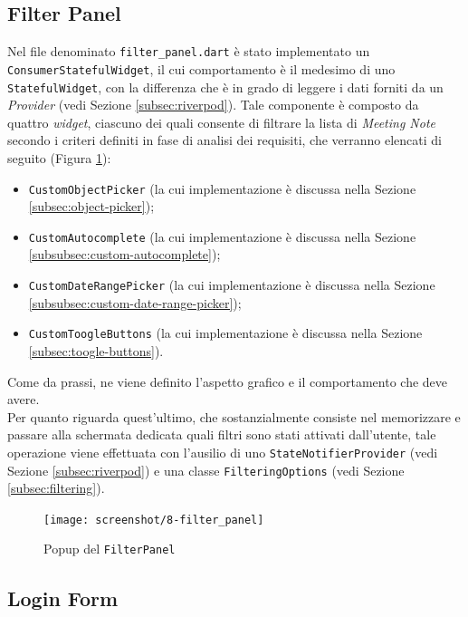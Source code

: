 \subsection{Filter Panel}
\label{subsec:filter-panel}

Nel file denominato \lstinline{filter_panel.dart} è stato implementato un \lstinline{ConsumerStatefulWidget}\cite{site:reading-provider}, il cui comportamento è il medesimo di uno \lstinline{StatefulWidget}, con la differenza che è in grado di leggere i dati forniti da un \emph{Provider} (vedi Sezione \ref{subsec:riverpod}).
Tale componente è composto da quattro \emph{widget}, ciascuno dei quali consente di filtrare la lista di \emph{Meeting Note}  secondo i criteri definiti in fase di analisi dei requisiti, che verranno elencati di seguito (Figura \ref{fig:filter-panel}):
\begin{itemize}
    \item \lstinline{CustomObjectPicker} (la cui implementazione è discussa nella Sezione \ref{subsec:object-picker});
    \item \lstinline{CustomAutocomplete} (la cui implementazione è discussa nella Sezione \ref{subsubsec:custom-autocomplete});
    \item \lstinline{CustomDateRangePicker} (la cui implementazione è discussa nella Sezione \ref{subsubsec:custom-date-range-picker});
    \item \lstinline{CustomToogleButtons} (la cui implementazione è discussa nella Sezione \ref{subsec:toogle-buttons}).
\end{itemize}
Come da prassi, ne viene definito l'aspetto grafico e il comportamento che deve avere.\\
Per quanto riguarda quest'ultimo, che sostanzialmente consiste nel memorizzare e passare alla schermata dedicata quali filtri sono stati attivati dall'utente, tale operazione viene effettuata con l'ausilio di uno \lstinline{StateNotifierProvider} (vedi Sezione \ref{subsec:riverpod}) e una classe \lstinline{FilteringOptions} (vedi Sezione \ref{subsec:filtering}).

\begin{figure}[!h] 
    \centering 
    \texttt{[image: screenshot/8-filter\_panel]} 
    \caption{Popup del \lstinline{FilterPanel}}
    \label{fig:filter-panel}
\end{figure}

\subsection{Login Form}
\label{subsec:login-form}

